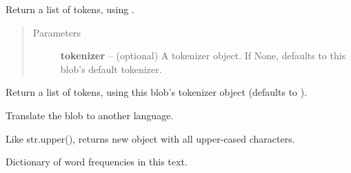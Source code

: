 \documentclass[letterpaper,10pt,english]{sphinxmanual}
\begin{document}
\begin{fulllineitems}
\begin{fulllineitems}
\label{api_reference:textblob_de.blob.BaseBlob.tokenize}
Return a list of tokens, using .
\begin{quote}\begin{description}
\item[{Parameters}] \leavevmode
\textbf{tokenizer} -- (optional) A tokenizer object. If None, defaults to
this blob's default tokenizer.

\end{description}\end{quote}

\end{fulllineitems}


\begin{fulllineitems}
\label{api_reference:textblob_de.blob.BaseBlob.tokens}
Return a list of tokens, using this blob's tokenizer object
(defaults to ).

\end{fulllineitems}


\begin{fulllineitems}
\label{api_reference:textblob_de.blob.BaseBlob.translate}
Translate the blob to another language.

\end{fulllineitems}


\begin{fulllineitems}
\label{api_reference:textblob_de.blob.BaseBlob.upper}
Like str.upper(), returns new object with all upper-cased characters.

\end{fulllineitems}


\begin{fulllineitems}
\label{api_reference:textblob_de.blob.BaseBlob.word_counts}
Dictionary of word frequencies in this text.


\end{fulllineitems}
\end{fulllineitems}
\end{document}
